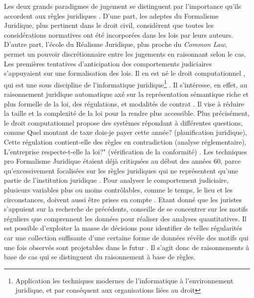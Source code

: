 Les deux grands paradigmes de jugement se distinguent par l'importance qu'ils accordent aux règles juridiques \citep{tumonis2012legalrealism}. D'une part, les adeptes du Formalisme Juridique, plus pertinent dans le droit civil, considèrent que toutes les considérations normatives ont été incorporées dans les lois par leurs auteurs. D'autre part, l'école du Réalisme Juridique, plus proche du \og \textit{Common Law}\fg{}, permet un pouvoir discrétionnaire entre les jugements en raisonnant selon le cas. Les premières tentatives d'anticipation des comportements judiciaires s'appuyaient sur une formalisation des lois. Il en est né le \og droit computationnel \fg{}, qui est une sous discipline de  l'\og informatique juridique\footnote{Application les techniques modernes de l'informatique à l'environnement juridique, et par conséquent aux organisations liées au droit} \fg{}. Il  s'intéresse, en effet, au raisonnement juridique automatique  axé sur la représentation sémantique riche et plus formelle de la loi, des régulations, et modalités de contrat \citep{love2005computationallaw}. Il vise à réduire la taille et la complexité de la loi pour la rendre plus accessible. Plus précisément, le \og droit computationnel \fg{} propose des systèmes répondant à différentes questions, comme \og Quel montant de taxe dois-je payer cette année? \fg{} (planification juridique), \og Cette régulation contient-elle des règles en contradiction\fg{} (analyse réglementaire),  \og L'entreprise respecte-t-elle la loi?" (vérification de la conformité) \citep{Genesereth2015computationallaw}. Les techniques pro Formalisme Juridique étaient déjà critiquées au début des années 60, parce qu'excessivement focalisées sur les règles juridiques qui ne représentent qu'une partie de l'institution juridique \citep{llewellyn1962jurisprudence}. Pour analyser le comportement judiciaire, plusieurs variables plus ou moins contrôlables, comme le temps, le lieu et les circonstances, doivent aussi être prises en compte \citep{ulmer1963quantitative}. Etant donné que les juristes s'appuient sur la recherche de précédents, \citet{ulmer1963quantitative} conseille de se concentrer sur les motifs réguliers que comprennent les données pour réaliser des analyses quantitatives. Il est possible d'exploiter la masse de décisions pour identifier de telles régularités car une collection suffisante d'une certaine forme de données révèle des motifs qui une fois observés sont projetables dans le futur \citep{ulmer1963quantitative}. Il s'agit donc de raisonnements à base de cas qui se distinguent du raisonnement à base de règles.

